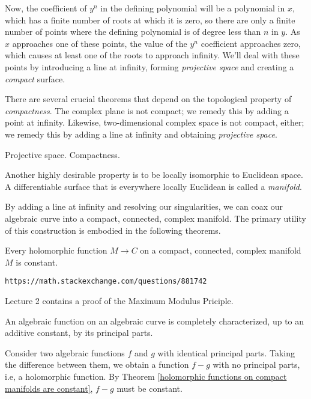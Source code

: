 Now, the coefficient of $y^n$ in the defining polynomial will be a
polynomial in $x$, which has a finite number of roots at which it is
zero, so there are only a finite number of points where the defining
polynomial is of degree less than $n$ in $y$.  As $x$ approaches one
of these points, the value of the $y^n$ coefficient approaches zero,
which causes at least one of the roots to approach infinity.  We'll
deal with these points by introducing a line at infinity, forming
{\it projective space} and creating a {\it compact} surface.

There are several crucial theorems that depend on the topological
property of {\it compactness}.  The complex plane is not compact; we
remedy this by adding a point at infinity.  Likewise, two-dimensional
complex space is not compact, either; we remedy this by adding a
line at infinity and obtaining {\it projective space}.

Projective space.  Compactness.

Another highly desirable property is to be locally isomorphic to
Euclidean space.  A differentiable surface that is everywhere locally
Euclidean is called a {\it manifold}.

By adding a line at infinity and resolving our singularities, we can
coax our algebraic curve into a compact, connected, complex manifold.
The primary utility of this construction is embodied in the following
theorems.

\theorem
\label{holomorphic functions on compact manifolds are constant}

Every holomorphic function $M \to C$ on a compact, connected, complex manifold $M$ is constant.

\proof

{\tt https://math.stackexchange.com/questions/881742}

\cite{guillemin} Lecture 2 contains a proof of the Maximum Modulus Priciple.

\endtheorem

\theorem
\label{algebraic functions are characterized by their principal parts}

An algebraic function on an algebraic curve is completely characterized, up to an additive
constant, by its principal parts.

\proof

Consider two algebraic functions $f$ and $g$ with identical principal
parts.  Taking the difference between them, we obtain a function $f-g$
with no principal parts, i.e, a holomorphic function.  By
Theorem \ref{holomorphic functions on compact manifolds are constant},
$f-g$ must be constant.

